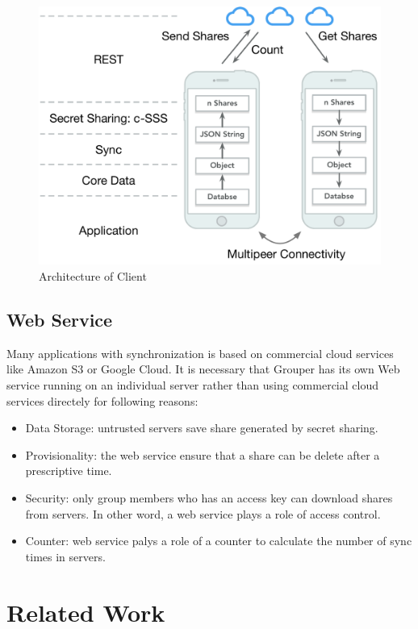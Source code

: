 \documentclass[twocolumn,10pt]{article}
\begin{document}
\begin{figure}[t]
\centering
\includegraphics[scale=0.35]{architecture}
\caption{Architecture of Client}
\end{figure}

\subsection{Web Service}
Many applications with synchronization is based on commercial cloud services like Amazon S3 or Google Cloud. It is necessary that Grouper has its own Web service running on an individual server rather than using commercial cloud services directely for following reasons:

\begin{itemize}
\setlength{\itemsep}{1pt}
\setlength{\parskip}{0pt}
\setlength{\parsep}{0pt}
    \item Data Storage: untrusted servers save share generated by secret sharing.
    \item Provisionality: the web service ensure that a share can be delete after a prescriptive time.
    \item Security: only group members who has an access key can download shares from servers. In other word, a web service plays a role of access control.
    \item Counter: web service palys a role of a counter to calculate the number of sync times in servers.
\end{itemize}

\section{Related Work}
\end{document}

